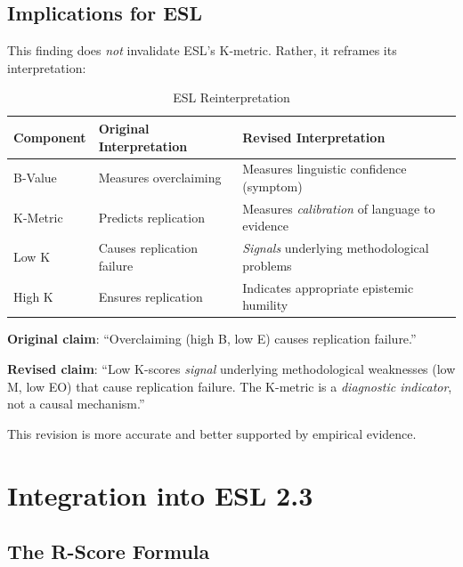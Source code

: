\documentclass[11pt,a4paper]{article}
\begin{document}
\subsection{Implications for ESL}

This finding does \textit{not} invalidate ESL's K-metric. Rather, it reframes its interpretation:

\begin{table}[h]
\centering
\caption{ESL Reinterpretation}
\label{tab:reinterpretation}
\begin{tabular}{lp{5cm}p{5cm}}
\toprule
\textbf{Component} & \textbf{Original Interpretation} & \textbf{Revised Interpretation} \\
\midrule
B-Value & Measures overclaiming & Measures linguistic confidence (symptom) \\
K-Metric & Predicts replication & Measures \textit{calibration} of language to evidence \\
Low K & Causes replication failure & \textit{Signals} underlying methodological problems \\
High K & Ensures replication & Indicates appropriate epistemic humility \\
\bottomrule
\end{tabular}
\end{table}

\begin{warningbox}[title={The Revised ESL Claim}]
\textbf{Original claim}: ``Overclaiming (high B, low E) causes replication failure.''

\textbf{Revised claim}: ``Low K-scores \textit{signal} underlying methodological weaknesses (low M, low EO) that cause replication failure. The K-metric is a \textit{diagnostic indicator}, not a causal mechanism.''

This revision is more accurate and better supported by empirical evidence.
\end{warningbox}


\section{Integration into ESL 2.3}
\label{sec:integration}

\subsection{The R-Score Formula}
\end{document}
